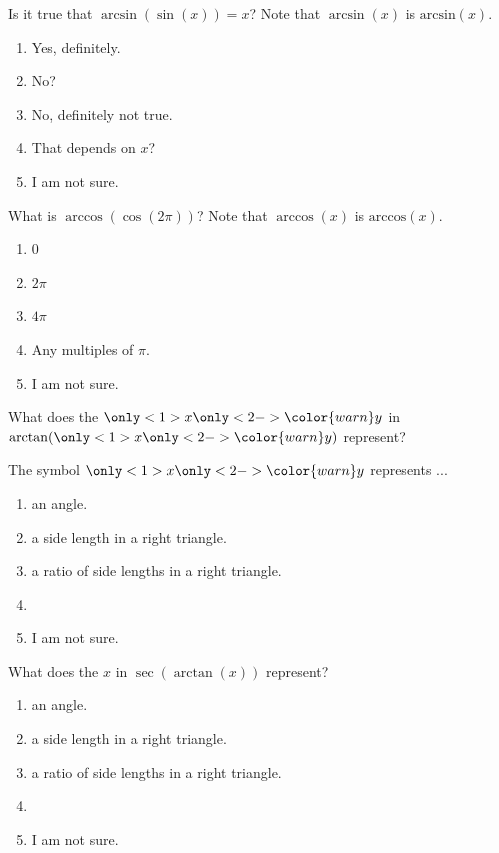 \documentclass[aspectratio=169, 14pt, t]{beamer}  %
\begin{document}
\begin{poll}
  Is it true that \(\arcsin(\sin(x)) = x\)? Note that \(\arcsin(x)\) is \(\mathrm{arcsin}(x)\).

  \begin{enumerate}
    \item Yes, definitely.
    \item No?
    \item No, definitely not true.
    \item That depends on \(x\)?
    \item I am not sure.
  \end{enumerate}
\end{poll}

\begin{poll}
  What is \(\arccos(\cos(2\pi))\)? Note that \(\arccos(x)\) is \(\mathrm{arccos}(x)\).

  \bigskip
  \begin{enumerate}
    \item \(0\)
    \item \(2\pi\)
    \item \(4\pi\)
    \item Any multiples of \(\pi\).
    \item I am not sure.
  \end{enumerate}
\end{poll}

\begin{poll}
  What does the \(\only<1>{x}\only<2->{{\color{warn}y}}\) in \(\arctan(\only<1>{x}\only<2->{{\color{warn}y}})\) represent?

  The symbol \(\only<1>{x}\only<2->{{\color{warn}y}}\) represents ...

  \begin{enumerate}
    \item an angle.
    \item a side length in a right triangle.
    \item a ratio of side lengths in a right triangle.
    \item
    \item I am not sure.
  \end{enumerate}
\end{poll}

\begin{poll}
  What does the \(x\) in \(\sec(\arctan(x))\) represent?

  \begin{enumerate}
    \item an angle.
    \item a side length in a right triangle.
    \item a ratio of side lengths in a right triangle.
    \item
    \item I am not sure.
  \end{enumerate}
\end{poll}
\end{document}
